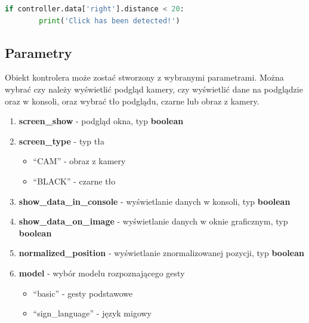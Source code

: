 \begin{lstlisting}[language=python, style=programming, caption={Odczyt edległości między palcami}]
    if controller.data['right'].distance < 20:
        print('Click has been detected!')
\end{lstlisting}

\subsection{Parametry}
\label{parametry}
\quad Obiekt kontrolera może zostać stworzony z wybranymi parametrami. Można wybrać czy należy wyświetlić podgląd kamery, czy wyświetlić dane na podglądzie oraz w konsoli, oraz wybrać tło podglądu, czarne lub obraz z kamery. 

\begin{enumerate}
    \item \textbf{screen\_show} - podgląd okna, typ \textbf{boolean}
    \item \textbf{screen\_type} - typ tła
    \begin{itemize}
        \item \enquote{CAM} - obraz z kamery
        \item \enquote{BLACK} - czarne tło
    \end{itemize}
    \item \textbf{show\_data\_in\_console} - wyświetlanie danych w konsoli, typ \textbf{boolean}
    \item \textbf{show\_data\_on\_image} - wyświetlanie danych w oknie graficznym, typ \textbf{boolean}
    \item \textbf{normalized\_position} - wyświetlanie znormalizowanej pozycji, typ \textbf{boolean}
    \item \textbf{model} - wybór modelu rozpoznającego gesty
    \begin{itemize}
        \item \enquote{basic} - gesty podstawowe
        \item \enquote{sign\_language} - język migowy
    \end{itemize}
\end{enumerate}


